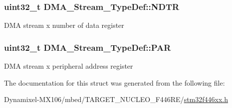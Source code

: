 \subsubsection[{\texorpdfstring{N\+D\+TR}{NDTR}}]{ uint32\+\_\+t D\+M\+A\+\_\+\+Stream\+\_\+\+Type\+Def\+::\+N\+D\+TR}\hypertarget{struct_d_m_a___stream___type_def_a2cc2a52628182f9e79ab1e49bb78a1eb}{}\label{struct_d_m_a___stream___type_def_a2cc2a52628182f9e79ab1e49bb78a1eb}
D\+MA stream x number of data register 
\subsubsection[{\texorpdfstring{P\+AR}{PAR}}]{ uint32\+\_\+t D\+M\+A\+\_\+\+Stream\+\_\+\+Type\+Def\+::\+P\+AR}\hypertarget{struct_d_m_a___stream___type_def_adbeac1d47cb85ab52dac71d520273947}{}\label{struct_d_m_a___stream___type_def_adbeac1d47cb85ab52dac71d520273947}
D\+MA stream x peripheral address register 

The documentation for this struct was generated from the following file\+:\begin{DoxyCompactItemize}
\item 
Dynamixel-\/\+M\+X106/mbed/\+T\+A\+R\+G\+E\+T\+\_\+\+N\+U\+C\+L\+E\+O\+\_\+\+F446\+R\+E/\hyperlink{stm32f446xx_8h}{stm32f446xx.\+h}\end{DoxyCompactItemize}
